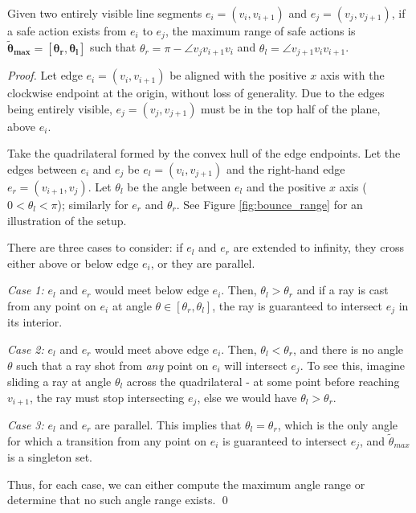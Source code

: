 \documentclass[]{styles/svproc}  %
\begin{document}
\begin{proposition} \label{prop:saferange}
Given two entirely visible line segments $e_i = (v_i, v_{i+1})$ and $e_j =
(v_j, v_{j+1})$, if a safe action
exists from $e_i$ to $e_j$, the maximum range of safe actions is $\bm{\tilde{\theta}_{max} = [\theta_r, \theta_l]}$ such
that $\theta_r = \pi - \angle v_j v_{i+1} v_i$ and $\theta_l = \angle v_{j+1}
v_i v_{i+1}$.
\end{proposition}

\begin{proof}

Let edge $e_i = (v_i, v_{i+1})$ be aligned with the positive $x$ axis with the clockwise
endpoint at the origin, without loss of generality. 
Due to the edges being
entirely visible, $e_j = (v_j, v_{j+1})$ must be in the top half of the plane, above
$e_i$.

Take the quadrilateral formed by the convex hull of the edge endpoints.
Let the edges between $e_i$ and $e_j$ be $e_l = (v_i, v_{j+1})$ and the right-hand edge 
$e_r = (v_{i+1}, v_j)$. Let $\theta_{l}$ be
the angle between $e_l$ and the positive $x$ axis ($0 < \theta_l < \pi$); similarly
for $e_r$ and $\theta_r$. See Figure \ref{fig:bounce_range} for an illustration of
the setup. 

There are three cases to consider: if $e_l$ and $e_r$ are extended to infinity,
they cross either above or below edge $e_i$, or they are parallel.

\emph{Case 1:} $e_l$ and $e_r$ would meet below edge $e_i$. Then,
$\theta_l > \theta_r$ and if a ray is cast from any point on $e_i$ at angle
$\theta \in [\theta_r, \theta_l]$, the ray is guaranteed to intersect $e_j$ in its
interior.

\emph{Case 2:} $e_l$ and $e_r$ would meet above edge $e_i$. Then, $\theta_l <
\theta_r$, and there is no angle
$\theta$ such that a ray shot from \emph{any} point on $e_i$ will intersect
$e_j$.
To see this, imagine sliding a ray at angle $\theta_l$ across the quadrilateral
- at some point before reaching $v_{i+1}$, the ray must stop intersecting $e_j$,
else we would have $\theta_l > \theta_r$.

\emph{Case 3:} $e_l$ and $e_r$ are parallel. This implies that $\theta_{l} =
\theta_{r}$, which is the only angle for which a transition from any
point on $e_i$ is guaranteed to intersect $e_j$, and $\tilde{\theta}_{max}$ is a
singleton set.

Thus, for each case, we can either compute the maximum angle range or determine
that no such angle range exists.
\qed

\end{proof}
\end{document}
